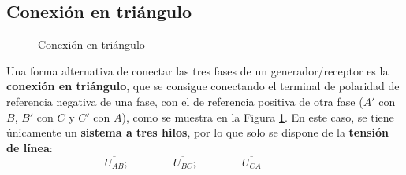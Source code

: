 \documentclass[11pt]{book} %
\begin{document}
	\subsection{Conexión en triángulo}\label{sec.triangulo}
	
	\begin{figure}[htbp]
		\centering
		\hfill
		\caption{Conexión en triángulo}
		\label{fig.conexion_triangulo}
	\end{figure}
	
	Una forma alternativa de conectar las tres fases de un generador/receptor es la \textbf{conexión en triángulo}, que se consigue conectando el terminal de polaridad de referencia negativa de una fase, con el de referencia positiva de otra fase ($A'$ con $B$, $B'$ con $C$ y $C'$ con $A$), como se muestra en la Figura \ref{fig.conexion_triangulo}. En este caso, se tiene únicamente un \textbf{sistema a tres hilos}, por lo que solo se dispone de la \textbf{tensión de línea}: 
	\begin{equation*}
	    \overline{U_{AB}};\qquad\qquad \overline{U_{BC}};\qquad\qquad \overline{U_{CA}}\qquad\qquad
	\end{equation*}
	
\end{document}
